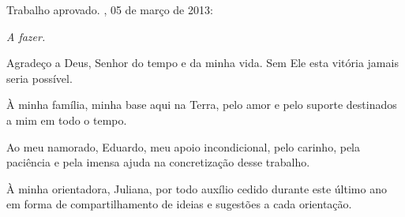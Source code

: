 \documentclass[12pt,oneside,a4paper,english,french,spanish]{abntex2}
\begin{document}

%
% 
%
\begin{folhadeaprovacao}

  \begin{center}
    {\ABNTEXchapterfont\large\imprimirautor}

    \vspace*{\fill}\vspace*{\fill}
    {\ABNTEXchapterfont\bfseries\Large\imprimirtitulo}
    \vspace*{\fill}
    
    \hspace{.45\textwidth}
    \begin{minipage}{.5\textwidth}
        \imprimirpreambulo
    \end{minipage}%
    \vspace*{\fill}
  \end{center}
    
  Trabalho aprovado. \imprimirlocal, 05 de março de 2013:

      
  \begin{center}
    \vspace*{0.5cm}
    {\large\imprimirlocal}
    \par
    {\large\imprimirdata}
    \vspace*{1cm}
  \end{center}
  
\end{folhadeaprovacao}

\begin{dedicatoria}
    \vspace*{\fill}
    \centering
    \noindent
    \textit{A fazer.} \vspace*{\fill}
\end{dedicatoria}

\begin{agradecimentos}
Agradeço a Deus, Senhor do tempo e da minha vida. Sem Ele esta vitória jamais seria possível. 

À minha família, minha base aqui na Terra, pelo amor e pelo suporte destinados a mim em todo o tempo.

Ao meu namorado, Eduardo, meu apoio incondicional, pelo carinho, pela paciência e pela imensa ajuda na concretização desse trabalho.

À minha orientadora, Juliana, por todo auxílio cedido durante este último ano em forma de compartilhamento de ideias e sugestões a cada orientação.
\end{agradecimentos}
\end{document}

